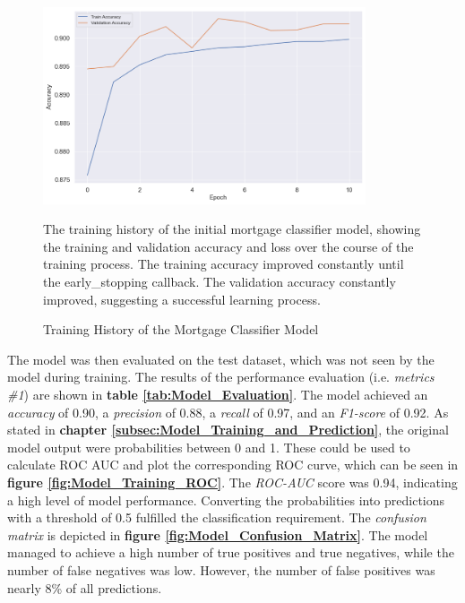 \begin{figure}
    \centering
    \includegraphics[width=0.85\textwidth]{images/Model_Training/Initial_Training_History.png}
    \caption{Training History of the Mortgage Classifier Model}
    \medskip
    \small
    The training history of the initial mortgage classifier model, showing the training and validation accuracy and loss over the course of the training process. The training accuracy improved constantly until the early\_stopping callback. The validation accuracy constantly improved, suggesting a successful learning process.
    \label{fig:Model_Training_History}
\end{figure}

The model was then evaluated on the test dataset, which was not seen by the model during training. The results of the performance evaluation (i.e. \textit{metrics \#1}) are shown in \textbf{table \ref{tab:Model_Evaluation}}. The model achieved an \textit{accuracy} of 0.90, a \textit{precision} of 0.88, a \textit{recall} of 0.97, and an \textit{F1-score} of 0.92. 
As stated in \textbf{chapter \ref{subsec:Model_Training_and_Prediction}}, the original model output were probabilities between 0 and 1. These could be used to calculate ROC AUC and plot the corresponding ROC curve, which can be seen in \textbf{figure \ref{fig:Model_Training_ROC}}. The \textit{ROC-AUC} score was 0.94, indicating a high level of model performance. 
Converting the probabilities into predictions with a threshold of 0.5 fulfilled the classification requirement. The \textit{confusion matrix} is depicted in \textbf{figure \ref{fig:Model_Confusion_Matrix}}. The model managed to achieve a high number of true positives and true negatives, while the number of false negatives was low. However, the number of false positives was nearly 8\% of all predictions.

